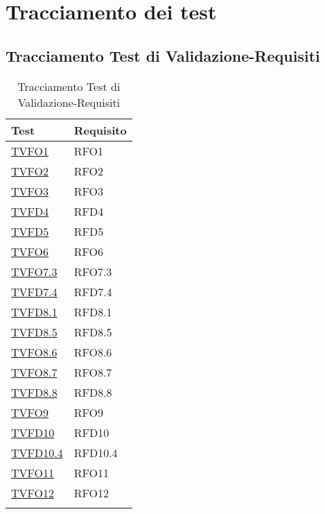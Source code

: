 \section{Tracciamento dei test}

\subsection{Tracciamento Test di Validazione-Requisiti}
\normalsize
\begin{longtable}[ht]{|>{\centering}m{5cm}|m{5cm}<{\centering}|}
\hline 
\textbf{Test} & \textbf{Requisito}\\
\hline
\endhead
\hyperlink{TVFO1}{TVFO1} & RFO1\\ \hline
\hyperlink{TVFO2}{TVFO2} & RFO2\\ \hline
\hyperlink{TVFO3}{TVFO3} & RFO3\\ \hline
\hyperlink{TVFD4}{TVFD4} & RFD4\\ \hline
\hyperlink{TVFD5}{TVFD5} & RFD5\\ \hline
\hyperlink{TVFO6}{TVFO6} & RFO6\\ \hline
\hyperlink{TVFO7.3}{TVFO7.3} & RFO7.3\\ \hline
\hyperlink{TVFD7.4}{TVFD7.4} & RFD7.4\\ \hline
\hyperlink{TVFD8.1}{TVFD8.1} & RFD8.1\\ \hline
\hyperlink{TVFD8.5}{TVFD8.5} & RFD8.5\\ \hline
\hyperlink{TVFO8.6}{TVFO8.6} & RFO8.6\\ \hline
\hyperlink{TVFO8.7}{TVFO8.7} & RFO8.7\\ \hline
\hyperlink{TVFD8.8}{TVFD8.8} & RFD8.8\\ \hline
\hyperlink{TVFO9}{TVFO9} & RFO9\\ \hline
\hyperlink{TVFD10}{TVFD10} & RFD10\\ \hline
\hyperlink{TVFD10.4}{TVFD10.4} & RFD10.4\\ \hline
\hyperlink{TVFO11}{TVFO11} & RFO11\\ \hline
\hyperlink{TVFO12}{TVFO12} & RFO12\\ \hline
\caption[Tracciamento Test di Validazione-Requisiti]{Tracciamento Test di Validazione-Requisiti}
\label{tabella:tv-requi}
\end{longtable}
\clearpage

